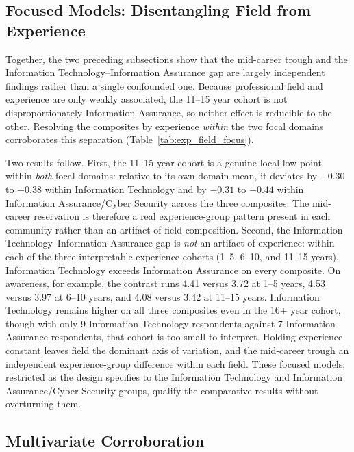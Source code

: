 \subsection{Focused Models: Disentangling Field from Experience}

Together, the two preceding subsections show that the mid-career trough and the Information Technology--Information Assurance gap are largely independent findings rather than a single confounded one. Because professional field and experience are only weakly associated, the 11--15 year cohort is not disproportionately Information Assurance, so neither effect is reducible to the other. Resolving the composites by experience \emph{within} the two focal domains corroborates this separation (Table~\ref{tab:exp_field_focus}).

Two results follow. First, the 11--15 year cohort is a genuine local low point within \emph{both} focal domains: relative to its own domain mean, it deviates by $-0.30$ to $-0.38$ within Information Technology and by $-0.31$ to $-0.44$ within Information Assurance/Cyber Security across the three composites. The mid-career reservation is therefore a real experience-group pattern present in each community rather than an artifact of field composition. Second, the Information Technology--Information Assurance gap is \emph{not} an artifact of experience: within each of the three interpretable experience cohorts (1--5, 6--10, and 11--15 years), Information Technology exceeds Information Assurance on every composite. On awareness, for example, the contrast runs 4.41 versus 3.72 at 1--5 years, 4.53 versus 3.97 at 6--10 years, and 4.08 versus 3.42 at 11--15 years. Information Technology remains higher on all three composites even in the 16+ year cohort, though with only 9 Information Technology respondents against 7 Information Assurance respondents, that cohort is too small to interpret. Holding experience constant leaves field the dominant axis of variation, and the mid-career trough an independent experience-group difference within each field. These focused models, restricted as the design specifies to the Information Technology and Information Assurance/Cyber Security groups, qualify the comparative results without overturning them.



\subsection{Multivariate Corroboration}

